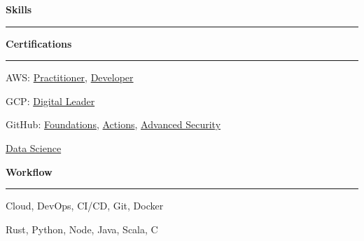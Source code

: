 \documentclass[11pt,letterpaper]{article}
\begin{document}
\begin{justify}
      {\Large \textbf{Skills}\strut}
      \hrule
      \begin{minipage}[t]{8.5cm}
            \textbf{Certifications}\strut
            \hrule
            \vspace{0.2cm}
            \begin{itemize}[label={}, leftmargin=0pt]
                  \begin{item}
                        AWS:
                        \href{https://www.credly.com/badges/33614ca6-2f0d-456b-87e9-bf8b8591cbf8/public_url}{Practitioner},
                        \href{https://www.credly.com/badges/e9b6c64c-2175-4345-950b-6331fd88af43/public_url}{Developer}
                  \end{item}
                  \begin{item}
                        GCP:
                        \href{https://www.credly.com/badges/0f158c45-adb0-4ac9-9d5f-0039649e4808/public_url}{Digital Leader}
                  \end{item}
                  \begin{item}
                        GitHub:
                        \href{https://www.credly.com/badges/0f59d53a-1ecb-4f6f-8a84-96fa3cb55965/public_url}{Foundations},
                        \href{https://www.credly.com/badges/6da40853-2bc6-4738-887e-8710a10e7a29/public_url}{Actions},
                        \href{https://www.credly.com/badges/b3c3ae21-61a9-4519-85d6-29a3bb8c443a/public_url}{Advanced Security}
                  \end{item}
                  \begin{item}
                        \href{https://bestr.it/verify/EJ2XAFDPBL}{Data Science}
                  \end{item}
            \end{itemize}
      \end{minipage}
      \hfill
      \begin{minipage}[t]{6.6cm}
            \textbf{Workflow}\strut
            \hrule
            \vspace{0.2cm}
            \begin{itemize}[label={}, leftmargin=0pt]
                  \begin{item}
                        Cloud, DevOps, CI/CD, Git, Docker
                  \end{item}
                  \begin{item}
                        Rust, Python, Node, Java, Scala, C
                  \end{item}

\end{itemize}
\end{minipage}
\end{justify}
\end{document}
